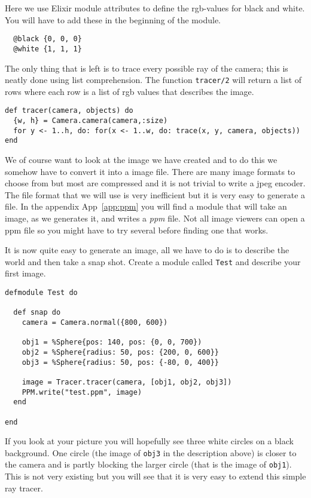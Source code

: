 \documentclass[a4paper,11pt]{article}
\begin{document}
Here we use Elixir module attributes to define the rgb-values for
black and white. You will have to add these in the beginning of the
module.

\begin{verbatim}
  @black {0, 0, 0}
  @white {1, 1, 1}
\end{verbatim}

The only thing that is left is to trace every possible ray of the
camera; this is neatly done using list comprehension. The function
{\tt tracer/2} will return a list of rows where each row is a list of
rgb values that describes the image.

\begin{verbatim}
def tracer(camera, objects) do
  {w, h} = Camera.camera(camera,:size)
  for y <- 1..h, do: for(x <- 1..w, do: trace(x, y, camera, objects))
end
\end{verbatim}

We of course want to look at the image we have created and to do this
we somehow have to convert it into a image file. There are many image
formats to choose from but most are compressed and it is not trivial
to write a jpeg encoder. The file format that we will use is very
inefficient but it is very easy to generate a file. In the appendix
App~\ref{app:ppm} you will find a module that will take an image, as we
generates it, and writes a {\em ppm} file. Not all image viewers can
open a ppm file so you might have to try several before finding one that works.

It is now quite easy to generate an image, all we have to do is to
describe the world and then take a snap shot. Create a module called
{\tt Test} and describe your first image.

\pagebreak

\begin{verbatim}
defmodule Test do

  def snap do
    camera = Camera.normal({800, 600})

    obj1 = %Sphere{pos: 140, pos: {0, 0, 700})
    obj2 = %Sphere{radius: 50, pos: {200, 0, 600}}
    obj3 = %Sphere{radius: 50, pos: {-80, 0, 400}}

    image = Tracer.tracer(camera, [obj1, obj2, obj3])
    PPM.write("test.ppm", image)
  end

end
\end{verbatim}

If you look at your picture you will hopefully see three white circles
on a black background. One circle (the image of {\tt obj3} in the
description above) is closer to the camera and is partly blocking the
larger circle (that is the image of {\tt obj1}). This is not very
existing but you will see that it is very easy to extend this simple
ray tracer.
\end{document}
